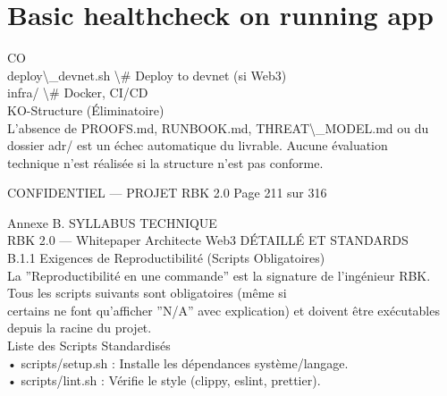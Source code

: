 \documentclass[12pt,landscape,a4paper]{article}
\newenvironment{confidential}
{\begin{tcolorbox}[
    colback=rbkred!5!white,
    colframe=rbkred!75!black,
    title=CONFIDENTIEL,
    fonttitle=\bfseries\color{white},
    coltitle=rbkred!75!black,
    breakable,
    enhanced,
    frame hidden,
    borderline west={2pt}{0pt}{rbkred!75!black}
]}
{\end{tcolorbox}}
\begin{document}
\section*{Basic healthcheck on running app}
CO\\
deploy\textbackslash{}_devnet.sh          \textbackslash{}# Deploy to devnet (si Web3)\\
\vspace{0.5em}
\vspace{0.5em}
infra/                      \textbackslash{}# Docker, CI/CD\\
\vspace{0.5em}
\vspace{0.5em}
KO-Structure (Éliminatoire)\\
L’absence de PROOFS.md, RUNBOOK.md, THREAT\textbackslash{}_MODEL.md ou du dossier adr/ est un échec automatique du livrable. Aucune évaluation\\
technique n’est réalisée si la structure n’est pas conforme.\\
\vspace{0.5em}
\vspace{0.5em}
\vspace{0.5em}
\vspace{0.5em}
\begin{confidential}CONFIDENTIEL — PROJET RBK 2.0                                 Page 211 sur 316\end{confidential}
Annexe B. SYLLABUS TECHNIQUE\\
RBK 2.0 — Whitepaper Architecte Web3                                                                      DÉTAILLÉ ET STANDARDS\\
\vspace{0.5em}
\vspace{0.5em}
B.1.1 Exigences de Reproductibilité (Scripts Obligatoires)\\
La ”Reproductibilité en une commande” est la signature de l’ingénieur RBK. Tous les scripts suivants sont obligatoires (même si\\
certains ne font qu’afficher ”N/A” avec explication) et doivent être exécutables depuis la racine du projet.\\
\vspace{0.5em}
Liste des Scripts Standardisés\\
\vspace{0.5em}
• scripts/setup.sh : Installe les dépendances système/langage.\\
\vspace{0.5em}
• scripts/lint.sh : Vérifie le style (clippy, eslint, prettier).\\
\end{document}
